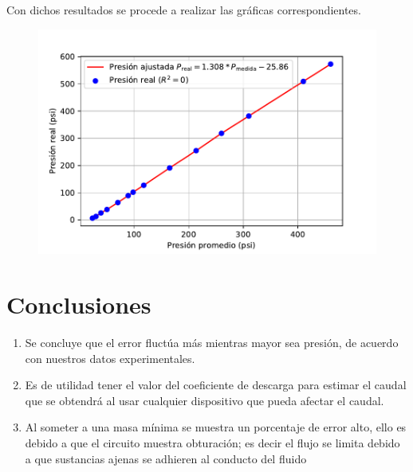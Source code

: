 \documentclass[a4paper,12pt]{report}
\begin{document}
Con dichos resultados se procede a realizar las gráficas correspondientes.
\begin{figure}[H]
\centering
\includegraphics[scale=0.9]{presiones.pdf}
\end{figure}
\chapter{Conclusiones}
\begin{enumerate}
\item Se concluye que el error fluctúa más mientras mayor sea presión, de acuerdo con nuestros datos experimentales.
\item Es de utilidad tener el valor del coeficiente de descarga para estimar el caudal que se obtendrá al usar cualquier dispositivo que pueda afectar el caudal.
\item Al someter a una masa mínima se muestra un porcentaje de error alto, ello es debido a que el circuito muestra obturación; es decir el flujo se limita debido a que sustancias ajenas se adhieren al conducto del fluido
\end{enumerate}
\end{document}
